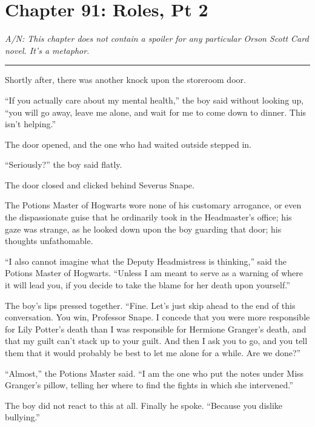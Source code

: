 \chapter{Chapter 91: Roles, Pt 2}
\emph{A/N: This chapter does not contain a spoiler for any particular
Orson Scott Card novel. It's a metaphor.}

\begin{center}\rule{3in}{0.4pt}\end{center}

Shortly after, there was another knock upon the storeroom door.

``If you actually care about my mental health,'' the boy said without
looking up, ``you will go away, leave me alone, and wait for me to come
down to dinner. This isn't helping.''

The door opened, and the one who had waited outside stepped in.

``Seriously?'' the boy said flatly.

The door closed and clicked behind Severus Snape.

The Potions Master of Hogwarts wore none of his customary arrogance, or
even the dispassionate guise that he ordinarily took in the Headmaster's
office; his gaze was strange, as he looked down upon the boy guarding
that door; his thoughts unfathomable.

``I also cannot imagine what the Deputy Headmistress is thinking,'' said
the Potions Master of Hogwarts. ``Unless I am meant to serve as a
warning of where it will lead you, if you decide to take the blame for
her death upon yourself.''

The boy's lips pressed together. ``Fine. Let's just skip ahead to the
end of this conversation. You win, Professor Snape. I concede that you
were more responsible for Lily Potter's death than I was responsible for
Hermione Granger's death, and that my guilt can't stack up to your
guilt. And then I ask you to go, and you tell them that it would
probably be best to let me alone for a while. Are we done?''

``Almost,'' the Potions Master said. ``I am the one who put the notes
under Miss Granger's pillow, telling her where to find the fights in
which she intervened.''

The boy did not react to this at all. Finally he spoke. ``Because you
dislike bullying.''

